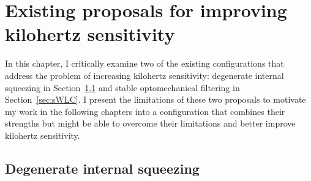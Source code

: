 \chapter{Existing proposals for improving kilohertz sensitivity} %
\label{chp:proposals}

In this chapter, I critically examine two of the existing configurations that address the problem of increasing kilohertz sensitivity: degenerate internal squeezing in Section~\ref{sec:dIS} and stable optomechanical filtering in Section~\ref{sec:sWLC}.
I present the limitations of these two proposals to motivate my work in the following chapters into a configuration that combines their strengths but might be able to overcome their limitations and better improve kilohertz sensitivity. 


\section{Degenerate internal squeezing}
\label{sec:dIS}

